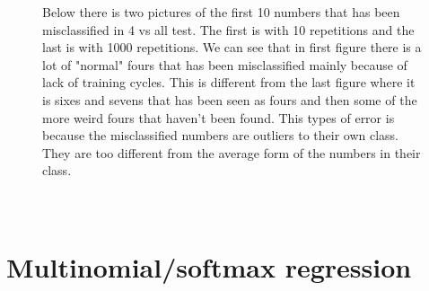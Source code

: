 \documentclass[paper=a4, fontsize=11pt]{scrartcl} %
\numberwithin{equation}{section} %
\numberwithin{figure}{section} %
\numberwithin{table}{section} %
\begin{document}
\begin{figure}
Below there is two pictures of the first 10 numbers that has been misclassified in 4 vs all test. The first is with 10 repetitions and the last is with 1000 repetitions. We can see that in first figure there is a lot of "normal" fours that has been misclassified mainly because of lack of training cycles. This is different from the last figure where it is sixes and sevens that has been seen as fours and then some of the more weird fours that haven't been found. This types of error is because the misclassified numbers are outliers to their own class. They are too different from the average form of the numbers in their class.  \\ \\
    ~
    \newline
\end{figure}
\newpage
\section{Multinomial/softmax regression}
\end{document}
